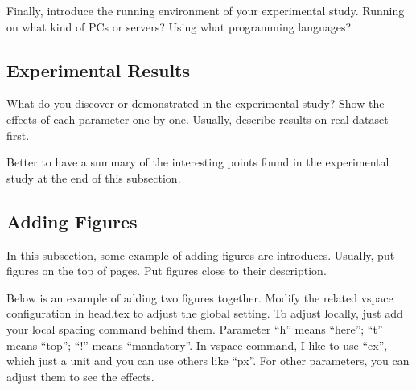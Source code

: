 Finally, introduce the running environment of your experimental study. Running on what kind of PCs or servers? Using what programming languages?

\subsection{Experimental Results}

What do you discover or demonstrated in the experimental study? Show the effects of each parameter one by one. Usually, describe results on real dataset first.

Better to have a summary of the interesting points found in the experimental study at the end of this subsection.

\subsection{Adding Figures}
In this subsection, some example of adding figures are introduces. Usually, put figures on the top of pages. Put figures close to their description. 

Below is an example of adding two figures together. Modify the related vspace configuration in head.tex to adjust the global setting. To adjust locally, just add your local spacing command behind them. Parameter ``h'' means ``here''; ``t'' means ``top''; ``!'' means ``mandatory''. In vspace command, I like to use ``ex'', which just a unit and you can use others like ``px''. For other parameters, you can adjust them to see the effects.

